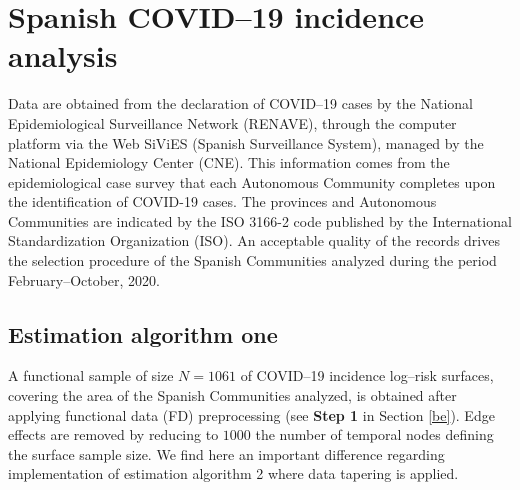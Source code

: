 \documentclass[11pt,a4paper]{article}
\begin{document}
\section{Spanish COVID--19 incidence analysis}
Data are obtained from the declaration of COVID--19 cases by the National Epidemiological Surveillance Network (RENAVE), through the computer platform via the Web SiViES (Spanish Surveillance System), managed by the National Epidemiology Center (CNE). This information comes from the epidemiological case survey that each Autonomous Community completes upon the identification of  COVID-19 cases. The provinces and Autonomous Communities are indicated by the ISO 3166-2 code published by the International Standardization Organization (ISO).  An acceptable  quality  of the  records drives the selection procedure of the Spanish Communities analyzed  during the period  February--October, 2020.

\subsection{Estimation algorithm one}
\label{ea1}
A functional sample of size $N=1061$ of  COVID--19 incidence log--risk  surfaces, covering the area of the Spanish Communities analyzed, is obtained after applying functional data (FD) preprocessing (see \textbf{Step 1} in Section \ref{be}).  Edge effects are removed by reducing to $1000$ the number of temporal nodes defining      the surface sample size.
We find here an important difference regarding implementation of estimation algorithm 2 where data tapering is applied.
\end{document}
